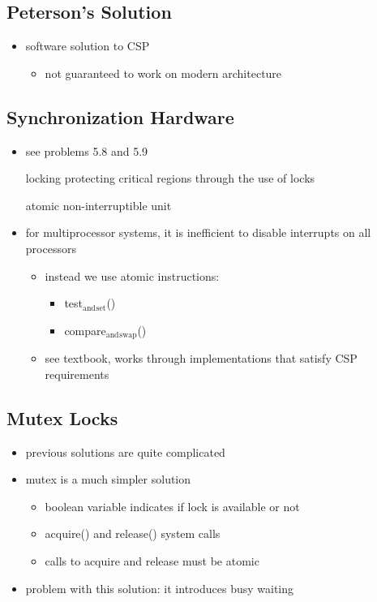 \documentclass[11pt]{article}
\begin{document}
\subsection{Peterson's Solution}
\label{sec:org03be973}
\begin{itemize}
\item software solution to CSP
\begin{itemize}
\item not guaranteed to work on modern architecture
\end{itemize}
\end{itemize}
\subsection{Synchronization Hardware}
\label{sec:orgb465a1e}
\begin{itemize}
\item see problems 5.8 and 5.9
\item[{locking}] protecting critical regions through the use of locks
\item[{atomic}] non-interruptible unit
\item for multiprocessor systems, it is inefficient to disable interrupts on all processors
\begin{itemize}
\item instead we use atomic instructions:
\begin{itemize}
\item test\(_{\text{and}}\)\(_{\text{set}}\)()
\item compare\(_{\text{and}}\)\(_{\text{swap}}\)()
\end{itemize}
\item see textbook, works through implementations that satisfy CSP requirements
\end{itemize}
\end{itemize}
\subsection{Mutex Locks}
\label{sec:org20c9321}
\begin{itemize}
\item previous solutions are quite complicated
\item mutex is a much simpler solution
\begin{itemize}
\item boolean variable indicates if lock is available or not
\item acquire() and release() system calls
\item calls to acquire and release must be atomic
\end{itemize}
\item problem with this solution: it introduces busy waiting
\end{itemize}
\end{document}
